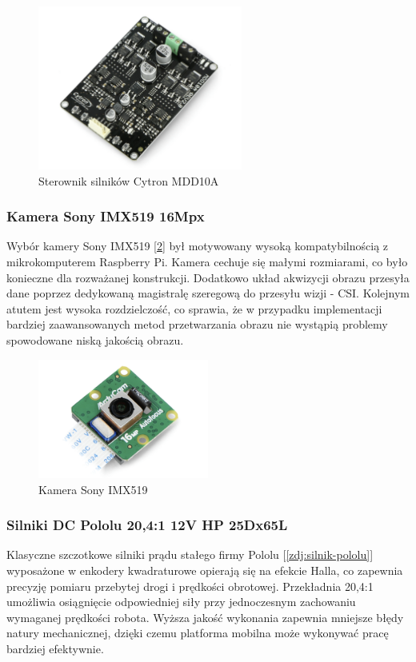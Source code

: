 \begin{figure}[H]
        \centering
        \includegraphics[width=0.6\textwidth]{./graf/cytron-mdd10a.png}
        \caption{Sterownik silników Cytron MDD10A}
        \label{zdj:cytron}
\end{figure}

\subsubsection*{Kamera Sony IMX519 16Mpx}
Wybór kamery Sony IMX519 [\ref{zdj:kamera-sony}] był motywowany wysoką kompatybilnością z mikrokomputerem Raspberry Pi. Kamera cechuje się małymi rozmiarami, co było konieczne dla rozważanej konstrukcji. Dodatkowo układ akwizycji obrazu przesyła dane poprzez dedykowaną magistralę szeregową do przesyłu wizji - CSI. Kolejnym atutem jest wysoka rozdzielczość, co sprawia, że w przypadku implementacji bardziej zaawansowanych metod przetwarzania obrazu nie wystąpią problemy spowodowane niską jakością obrazu. 

\begin{figure}[H]
        \centering
        \includegraphics[width=0.5\textwidth]{./graf/kamera-sony.png}
        \caption{Kamera Sony IMX519}
        \label{zdj:kamera-sony}
\end{figure}

\subsubsection*{Silniki DC Pololu 20,4:1 12V HP 25Dx65L}
Klasyczne szczotkowe silniki prądu stałego firmy Pololu [\ref{zdj:silnik-pololu}] wyposażone w enkodery kwadraturowe opierają się na efekcie Halla, co zapewnia precyzję pomiaru przebytej drogi i prędkości obrotowej. Przekładnia 20,4:1 umożliwia osiągnięcie odpowiedniej siły przy jednoczesnym zachowaniu wymaganej prędkości robota. Wyższa jakość wykonania zapewnia mniejsze błędy natury mechanicznej, dzięki czemu platforma mobilna może wykonywać pracę bardziej efektywnie. 

